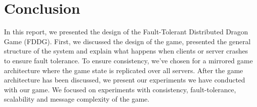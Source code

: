 \section{Conclusion}
In this report, we presented the design of the Fault-Tolerant Distributed Dragon Game (FDDG). First, we discussed the design of the game, presented the general structure of the system and explain what happens when clients or server crashes to ensure fault tolerance. To ensure consistency, we've chosen for a mirrored game architecture where the game state is replicated over all servers. After the game architecture has been discussed, we present our experiments we have conducted with our game. We focused on experiments with consistency, fault-tolerance, scalability and message complexity of the game.\\
